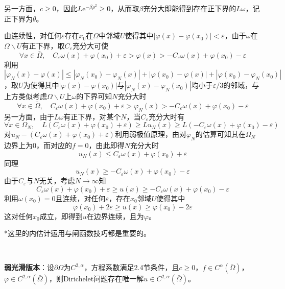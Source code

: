 \documentclass[a4paper,UTF8,fontset=windows,AutoFakeBold]{ctexart}
\newcommand*{\er}{\mathrm{e}}
\begin{document}
{    另一方面，$c\ge0$，因此$L\er^{-\beta\rho^2}\ge0$，从而取$\beta$充分大即能得到存在正下界的$L\omega$，记正下界为$\theta$。

    由连续性，对任何$\varepsilon$存在$x_0$在$\Omega$中邻域$U$使得其中$|\varphi(x)-\varphi(x_0)|<\varepsilon$，由于$\omega$在$\Omega\backslash U$有正下界，取$C_\varepsilon$充分大可使
    $$\forall x\in\bar\Omega,\quad C_\varepsilon\omega(x)+\varphi(x_0)+\varepsilon>\varphi(x)>-C_\varepsilon\omega(x)+\varphi(x_0)-\varepsilon$$
    利用$|\varphi_N(x)-\varphi(x)|\le|\varphi_N(x_0)-\varphi_N(x)|+|\varphi(x_0)-\varphi(x)|+|\varphi(x_0)-\varphi_N(x_0)|$，取$U$为使得其中$|\varphi(x)-\varphi(x_0)|$与$|\varphi_N(x)-\varphi_N(x_0)|$均小于$\varepsilon/3$的邻域，与上方类似考虑$\Omega\backslash U$上$\omega$的下界可知$N$充分大时
    $$\forall x\in\bar\Omega,\quad C_\varepsilon\omega(x)+\varphi(x_0)+\varepsilon>\varphi_N(x)>-C_\varepsilon\omega(x)+\varphi(x_0)-\varepsilon$$
    另一方面，由于$L\omega$有正下界，对某个$N$，当$C_\varepsilon$充分大时有
    $$\forall x\in\Omega_N,\quad L(C_\varepsilon\omega(x)+\varphi(x_0)+\varepsilon)\ge Lu_N(x)\ge L(-C_\varepsilon\omega(x)+\varphi(x_0)-\varepsilon)$$
    对$u_N-(C_\varepsilon\omega(x)+\varphi(x_0)+\varepsilon)$利用弱极值原理，由对$\varphi_N$的估算可知其在$\Omega_N$边界上为0，而对应的$f=0$，由此即得$N$充分大时
    $$u_N(x)\le C_\varepsilon\omega(x)+\varphi(x_0)+\varepsilon$$
    同理
    $$u_N(x)\ge -C_\varepsilon\omega(x)+\varphi(x_0)-\varepsilon$$
    由于$C_\varepsilon$与$N$无关，考虑$N\to\infty$知
    $$C_\varepsilon\omega(x)+\varphi(x_0)+\varepsilon\ge u(x)\ge-C_\varepsilon\omega(x)+\varphi(x_0)-\varepsilon$$
    利用$\omega(x_0)=0$且连续，对任何$\varepsilon$，存在$x_0$邻域$U$使得其中
    $$\varphi(x_0)+2\varepsilon\ge u(x)\ge\varphi(x_0)-2\varepsilon$$
    这对任何$x_0$成立，即得到$u$在边界连续，且为$\varphi$。
}

*这里的内估计运用与闸函数技巧都是重要的。

\

\textbf{弱光滑版本}：设$\partial\Omega$为$C^{2,\alpha}$，方程系数满足2.4节条件，且$c\ge0$，$f\in C^\alpha(\bar\Omega)$，$\varphi\in C^{2,\alpha}(\bar\Omega)$，则Dirichelet问题存在唯一解$u\in C^{2,\alpha}(\bar\Omega)$。
\end{document}
